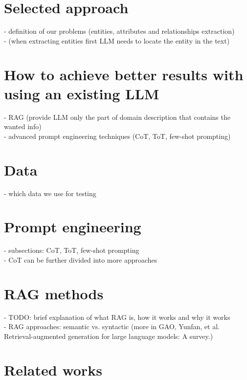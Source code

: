 \section*{Selected approach}

- definition of our problems (entities, attributes and relationships extraction) \\
- (when extracting entities first LLM needs to locate the entity in the text) \\

\section*{How to achieve better results with using an existing LLM}
- RAG (provide LLM only the part of domain description that contains the wanted info) \\
- advanced prompt engineering techniques (CoT, ToT, few-shot prompting) \\


\section*{Data}

- which data we use for testing


\section*{Prompt engineering}
- subsections: CoT, ToT, few-shot prompting \\
- CoT can be further divided into more approaches


\section*{RAG methods}
- TODO: brief explanation of what RAG is, how it works and why it works \\
- RAG approaches: semantic vs. syntactic (more in GAO, Yunfan, et al. Retrieval-augmented generation for large language models: A survey.) \\


\section*{Related works}